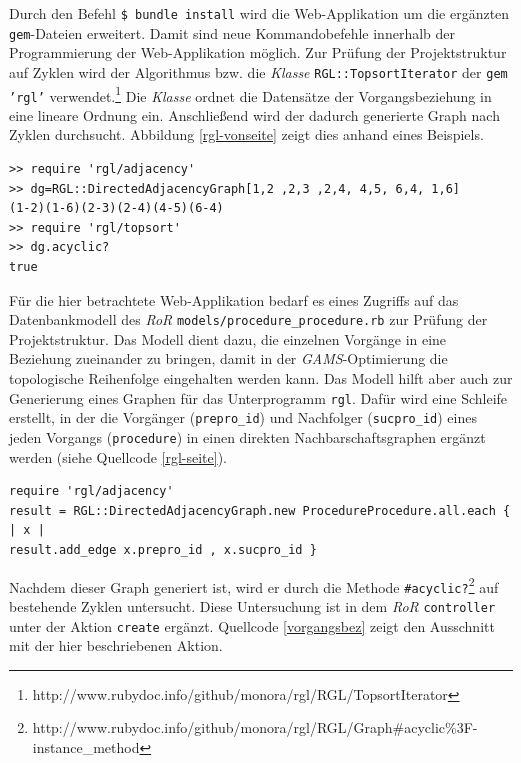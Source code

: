 \documentclass[a4paper,12pt,parskip,bibtotoc,liststotoc]{article}
\begin{document}
Durch den Befehl \texttt{\$ bundle install} wird die Web-Applikation um die ergänzten \texttt{gem}-Dateien erweitert. Damit sind neue Kommandobefehle innerhalb der Programmierung der Web-Applikation möglich. Zur Prüfung der Projektstruktur auf Zyklen wird der Algorithmus bzw. die \textit{Klasse} \texttt{RGL::TopsortIterator} der \texttt{gem 'rgl'} verwendet.\footnote{http://www.rubydoc.info/github/monora/rgl/RGL/TopsortIterator} Die \textit{Klasse} ordnet die Datensätze der Vorgangsbeziehung in eine lineare Ordnung ein. Anschließend wird der dadurch generierte Graph nach Zyklen durchsucht. Abbildung \ref{rgl-vonseite} zeigt dies anhand eines Beispiels.
\begin{lstlisting}[caption=Prüfung auf Zyklen mittels des Unterprogramms \glqq rgl\grqq, style=Listing, label=rgl-vonseite]
>> require 'rgl/adjacency'
>> dg=RGL::DirectedAdjacencyGraph[1,2 ,2,3 ,2,4, 4,5, 6,4, 1,6]
(1-2)(1-6)(2-3)(2-4)(4-5)(6-4)
>> require 'rgl/topsort'
>> dg.acyclic?
true
\end{lstlisting}

Für die hier betrachtete Web-Applikation bedarf es eines Zugriffs auf das Datenbankmodell des \textit{RoR} \texttt{models/procedure\_procedure.rb} zur Prüfung der Projektstruktur. Das Modell dient dazu, die einzelnen Vorgänge in eine Beziehung zueinander zu bringen, damit in der \textit{GAMS}-Optimierung die topologische Reihenfolge eingehalten werden kann. Das Modell hilft aber auch zur Generierung eines Graphen für das Unterprogramm \texttt{rgl}. Dafür wird eine Schleife erstellt, in der die Vorgänger (\texttt{prepro\_id}) und Nachfolger (\texttt{sucpro\_id}) eines jeden Vorgangs (\texttt{procedure}) in einen direkten Nachbarschaftsgraphen ergänzt werden (siehe Quellcode \ref{rgl-seite}).

\begin{lstlisting}[caption=Erstellung eines Graphen mittels des Unterprogramms \glqq rgl\grqq, style=Listing, label=rgl-seite]
require 'rgl/adjacency'
result = RGL::DirectedAdjacencyGraph.new ProcedureProcedure.all.each { | x |
result.add_edge x.prepro_id , x.sucpro_id }
\end{lstlisting}
\vspace{0.5cm} 

Nachdem dieser Graph generiert ist, wird er durch die Methode \texttt{\#acyclic?}\footnote{http://www.rubydoc.info/github/monora/rgl/RGL/Graph\#acyclic\%3F-instance\_method} auf bestehende Zyklen untersucht. Diese Untersuchung ist in dem \textit{RoR} \texttt{controller} unter der Aktion \texttt{create} ergänzt. Quellcode \ref{vorgangsbez} zeigt den Ausschnitt mit der hier beschriebenen Aktion.\\
\end{document}
